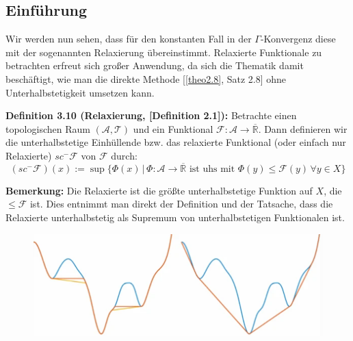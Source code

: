 \subsection{Einführung}{\label{subsec:relaxintro}}
Wir werden nun sehen, dass für den konstanten Fall in der \(\Gamma\)-Konvergenz diese mit der sogenannten Relaxierung übereinstimmt. Relaxierte Funktionale zu betrachten erfreut sich großer Anwendung, da sich die Thematik damit beschäftigt, wie man die direkte Methode [\ref{theo2.8}, Satz 2.8] ohne Unterhalbstetigkeit umsetzen kann.\\[0.5cm]
\colorbox{generalYellow}{\begin{minipage}{16cm}{\textcolor{black}{}{\label{def3.10}}}
\textbf{Definition 3.10 (Relaxierung, \cite{RelaxPaper}[Definition 2.1]):} Betrachte einen topologischen Raum \((\mathcal{A},\mathcal{T})\) und ein Funktional \(\mathcal{F}:\mathcal{A} \to \overline{\mathbb{R}}\). Dann definieren wir die unterhalbstetige Einhüllende bzw. das relaxierte Funktional (oder einfach nur Relaxierte) \(sc^- \mathcal{F}\) von \(\mathcal{F}\) durch:
\begin{equation}
    (sc^-\mathcal{F})(x) := \sup \{\Phi(x) \, | \, \Phi : \mathcal{A} \to \overline{\mathbb{R}} \text{ ist uhs mit }\Phi(y) \le \mathcal{F}(y) \, \forall y \in X\}
\end{equation}
\end{minipage}}

\textbf{Bemerkung:} Die Relaxierte ist die größte unterhalbstetige Funktion auf \(X\), die \(\le \mathcal{F}\) ist. Dies entnimmt man direkt der Definition und der Tatsache, dass die Relaxierte unterhalbstetig als Supremum von unterhalbstetigen Funktionalen ist.\\

\begin{figure}[label={fig:einh}, caption={Das Konzept der Einhüllenden: In blau eine gegebene Funktion; quasikonvexe Einhüllende (rot/orange), robust quasikonvexe Einhüllende (gelb) links; konvexe Einhüllende (rot/orange) rechts}]
    \includegraphics[scale=0.6]{figures/Einhuellende.png}
\end{figure}

